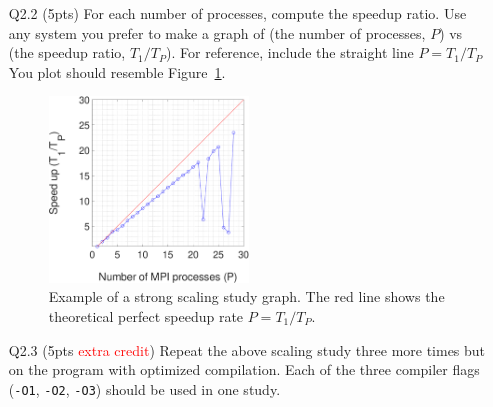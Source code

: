 \begin{itemize}
    As a reminder, you can request an interactive session with the command
    \begin{tsession}{mytermbg}
    \begin{verbatim}
salloc --partition=dev_q --nodes=1 --tasks-per-node=28 -A cmda3634\end{verbatim}
    \end{tsession}
    Don't forget to load the right modules with
    \begin{tsession}{mytermbg}
    \begin{verbatim}
module purge
module load gcc openmpi\end{verbatim}
    \end{tsession}
    You should be able to perform all 28 runs with one terminal command.
    If your compiled executable is called \texttt{go},
    the following loop (in the Linux terminal) will run the executable 28 times, once with each number of processes.
    \begin{tsession}{mytermbg}
    \begin{verbatim}
for P in `seq 1 28`;
do
   mpiexec -n $P ./go data/mpiClusters.dat
done\end{verbatim}
    \end{tsession}
    Of course, the above loop assumes that the data file that you want to analyze is \texttt{data/mpiClusters.dat}.
    \item[Q2.2] (5pts) For each number of processes, compute the speedup ratio.
    Use any system you prefer to make a graph of (the number of processes, $P$) vs (the speedup ratio, $T_1/T_P$).
    For reference, include the straight line $P=T_1/T_P$
    You plot should resemble Figure~\ref{fig_strong_scaling}.
    \begin{figure}[hbtp]
        \centering
        \includegraphics[width=0.5\textwidth]{figures/CMDA3634FA19HW/strongsScalingStudy.pdf}
        \caption{Example of a strong scaling study graph.
        The red line shows the theoretical perfect speedup rate $P=T_1/T_P$.}
        \label{fig_strong_scaling}
    \end{figure}
    \item[Q2.3] (5pts \textcolor{red}{extra credit}) Repeat the above scaling study three more times but on the program with optimized compilation.
    Each of the three compiler flags (\texttt{-O1}, \texttt{-O2}, \texttt{-O3}) should be used in one study.
\end{itemize}
\newpage
